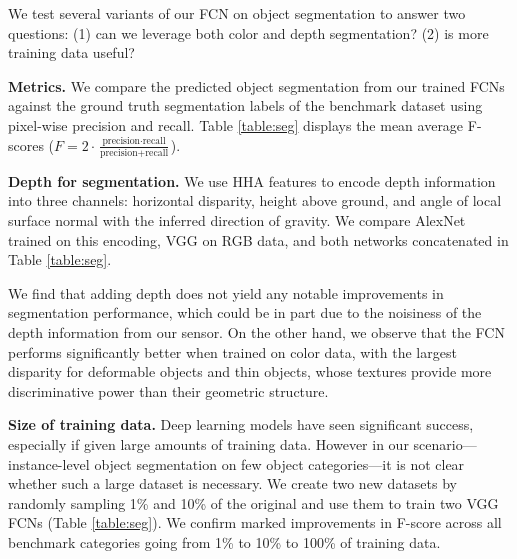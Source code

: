 \documentclass[letterpaper, 10 pt, conference]{ieeeconf}  %
\newcommand{\myparagraph}[1]{\vspace{0.1in}\noindent\textbf{#1}}
\begin{document}
We test several variants of our FCN on object segmentation to answer two questions: (1) can we leverage both color and depth segmentation? (2) is more training data useful? 


\myparagraph{Metrics.} We compare the predicted object segmentation from our trained FCNs against the ground truth segmentation labels of the benchmark dataset using pixel-wise precision and recall. Table \ref{table:seg} displays the mean average F-scores ($F=2\cdot\frac{\text{precision}\cdot\text{recall}}{\text{precision}+\text{recall}}$).


\myparagraph{Depth for segmentation.} We use HHA features \cite{gupta2014learning} to encode depth information into three channels: horizontal disparity, height above ground, and angle of local surface normal with the inferred direction of gravity. We compare AlexNet trained on this encoding, VGG on RGB data, and both networks concatenated in Table \ref{table:seg}.

We find that adding depth does not yield any notable improvements in segmentation performance, which could be in part due to the noisiness of the depth information from our sensor. On the other hand, we observe that the FCN performs significantly better when trained on color data, with the largest disparity for deformable objects and thin objects, whose textures provide more discriminative power than their geometric structure.

\myparagraph{Size of training data.} Deep learning models have seen significant success, especially if given large amounts of training data. However in our scenario---instance-level object segmentation on few object categories---it is not clear whether such a large dataset is necessary. We create two new datasets by randomly sampling 1\% and 10\% of the original and use them to train two VGG FCNs (Table \ref{table:seg}). We confirm marked improvements in F-score across all benchmark categories going from 1\% to 10\% to 100\% of training data.

\end{document}
